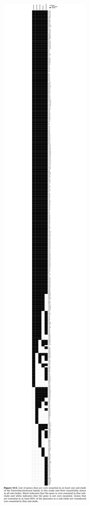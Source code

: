 \documentclass{article}
\newcommand{\Newpage}{\end{preview}\begin{preview}}
\begin{document}
\begin{preview}
\includegraphics{suppl12.pdf}
\Newpage

\end{preview}
\end{document}
